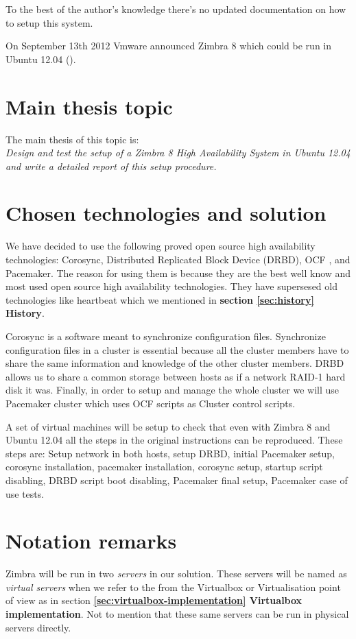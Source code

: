 To the best of the author's knowledge there's no updated documentation on how to setup this system.

On September 13th 2012 Vmware announced Zimbra 8 which could be run in Ubuntu 12.04 (\cite{VmwareZimbra8Announce}).

\section {Main thesis topic}
The main thesis of this topic is: \\
\textit{Design and test the setup of a Zimbra 8 High Availability System in Ubuntu 12.04 and write a detailed report of this setup procedure.}

\section {Chosen technologies and solution}
We have decided to use the following proved open source high availability technologies: Corosync, Distributed Replicated Block Device (DRBD), OCF , and Pacemaker. The reason for using them is because they are the best well know and most used open source high availability technologies. They have supersesed old technologies like heartbeat which we mentioned in \textbf{section {\ref{sec:history} History}}.

Corosync is a software meant to synchronize configuration files. Synchronize configuration files in a cluster is essential because all the cluster members have to share the same information and knowledge of the other cluster members. DRBD allows us to share a common storage between hosts as if a network RAID-1 hard disk it was. Finally, in order to setup and manage the whole cluster we will use Pacemaker cluster which uses OCF scripts as Cluster control scripts.

A set of virtual machines will be setup to check that even with Zimbra 8 and Ubuntu 12.04 all the steps in the original instructions can be reproduced. These steps are: Setup network in both hosts, setup DRBD, initial Pacemaker setup, corosync installation, pacemaker installation, corosync setup, startup script disabling, DRBD script boot disabling, Pacemaker final setup, Pacemaker case of use tests.

\section {Notation remarks}
Zimbra will be run in two \textit{servers} in our solution. These servers will be named as \textit{virtual servers} when we refer to the from the Virtualbox or Virtualisation point of view as in section \textbf {\ref{sec:virtualbox-implementation} Virtualbox implementation}. Not to mention that these same servers can be run in physical servers directly.

